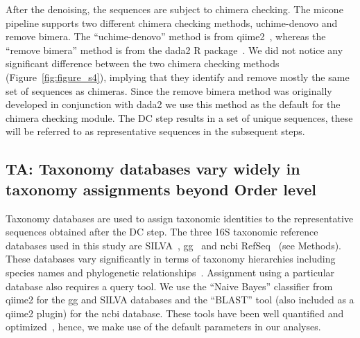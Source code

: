   After the denoising, the sequences are subject to chimera checking.
  The \ac{micone} pipeline supports two different chimera checking methods, uchime-denovo and remove bimera.
  The ``uchime-denovo'' method is from \ac{qiime2}~\cite{bolyenReproducibleInteractiveScalable2019}, whereas the ``remove bimera'' method is from the \ac{dada2} R package~\cite{Callahan2016}.
  We did not notice any significant difference between the two chimera checking methods (Figure~\ref{fig:figure_s4}), implying that they identify and remove mostly the same set of sequences as chimeras.
  Since the remove bimera method was originally developed in conjunction with dada2 we use this method as the default for the chimera checking module.
  The DC step results in a set of unique sequences, these will be referred to as representative sequences in the subsequent steps.

  \FloatBarrier

  \subsection*{TA: Taxonomy databases vary widely in taxonomy assignments beyond Order level}

  Taxonomy databases are used to assign taxonomic identities to the representative sequences obtained after the DC step.
  The three 16S taxonomic reference databases used in this study are SILVA~\cite{Quast2012}, \ac{gg}~\cite{DeSantis2006} and \ac{ncbi} RefSeq~\cite{Sayers2009} (see Methods).
  These databases vary significantly in terms of taxonomy hierarchies including species names and phylogenetic relationships~\cite{Balvociute2017}.
  Assignment using a particular database also requires a query tool.
  We use the ``Naive Bayes'' classifier from \ac{qiime2} for the \ac{gg} and SILVA databases and the ``BLAST'' tool (also included as a \ac{qiime2} plugin) for the \ac{ncbi} database.
  These tools have been well quantified and optimized~\cite{bokulichOptimizingTaxonomicClassification2018}, hence, we make use of the default parameters in our analyses.


